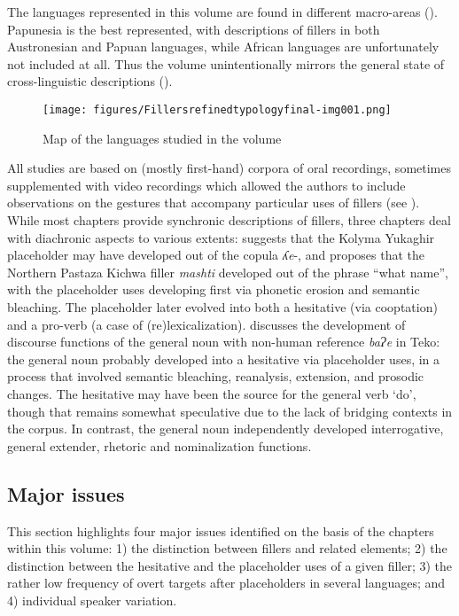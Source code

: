 \documentclass[output=paper]{langscibook}
\begin{document}
The languages represented in this volume are found in different macro-areas (). Papunesia is the best represented, with descriptions of fillers in both Austronesian and Papuan languages, while African languages are unfortunately not included at all. Thus the volume unintentionally mirrors the general state of cross-linguistic descriptions ().

\begin{figure}
\texttt{[image: figures/Fillersrefinedtypologyfinal-img001.png]}
\caption{Map of the languages studied in the volume}
\label{fig:intro:1}
\end{figure}

All studies are based on (mostly first-hand) corpora of oral recordings, sometimes supplemented with video recordings which allowed the authors to include observations on the gestures that accompany particular uses of fillers (see ). While most chapters provide synchronic descriptions of fillers, three chapters deal with diachronic aspects to various extents: \citeauthor{chapters/ventayol_boada} suggests that the Kolyma Yukaghir placeholder may have developed out of the copula \textit{ʎe}-, and \citeauthor{chapters/rice} proposes that the Northern Pastaza Kichwa filler \textit{mashti} developed out of the phrase “what name”, with the placeholder uses developing first via phonetic erosion and semantic bleaching. The placeholder later evolved into both a hesitative (via cooptation) and a pro-verb (a case of (re)lexicalization). \citeauthor{chapters/rose} discusses the development of discourse functions of the general noun with non-human reference \textit{baɁe} in Teko: the general noun probably developed into a hesitative via placeholder uses, in a process that involved semantic bleaching, reanalysis, extension, and prosodic changes. The hesitative may have been the source for the general verb ‘do’, though that remains somewhat speculative due to the lack of bridging contexts in the corpus. In contrast, the general noun independently developed interrogative, general extender, rhetoric and nominalization functions.

\subsection{Major issues}\label{sec:intro:9.2}

This section highlights four major issues identified on the basis of the chapters within this volume: 1) the distinction between fillers and related elements; 2) the distinction between the hesitative and the placeholder uses of a given filler; 3) the rather low frequency of overt targets after placeholders in several languages; and 4) individual speaker variation.
\end{document}
